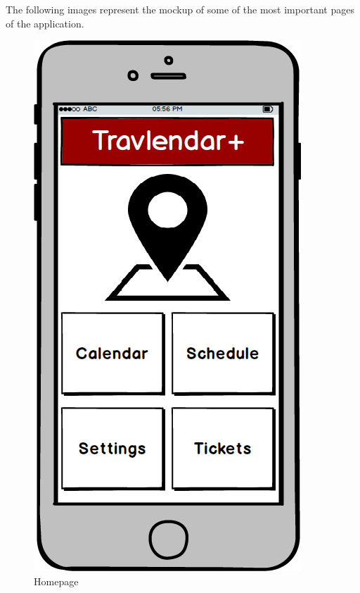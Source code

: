 The following images represent the mockup of some of the most important pages of the application.\\

\begin{figure}[!htb]

\begin{minipage}[b]{0.3\textwidth}
	\centering
	\includegraphics[scale=0.3]{images/Homepage}
	\caption{Homepage}
	\label{ref:homepage}
\end{minipage}
\hfill
\begin{minipage}[b]{0.3\textwidth}
	\centering

\end{minipage}
\end{figure}
